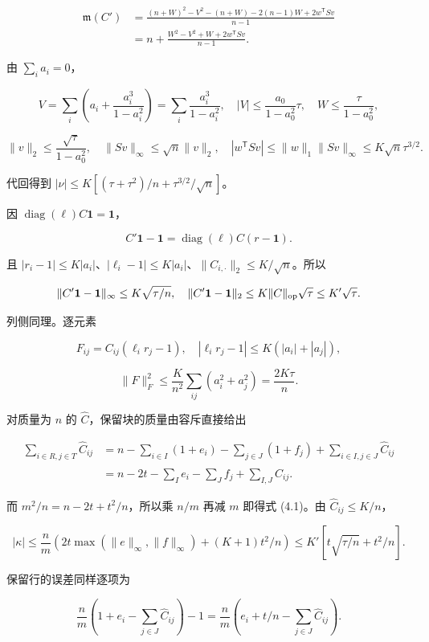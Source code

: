 \documentclass[11pt,a4paper]{article}
\begin{document}
\[
\begin{aligned}
\mathfrak m(C')&=\frac{(n+W)^2-V^2-(n+W)-2(n-1)W+2w^{\mathsf T}Sv}{n-1}\\
&=n+\frac{W^2-V^2+W+2w^{\mathsf T}Sv}{n-1}.
\end{aligned}
\]

由 \(\sum_i a_i=0\)，

\[
V=\sum_i\left(a_i+\frac{a_i^3}{1-a_i^2}\right)
=\sum_i\frac{a_i^3}{1-a_i^2},\quad
|V|\le\frac{a_0}{1-a_0^2}\tau,
\quad W\le\frac\tau{1-a_0^2},
\]

\[
\|v\|_2\le\frac{\sqrt\tau}{1-a_0^2},\quad
\|Sv\|_\infty\le\sqrt n\|v\|_2,\quad
|w^{\mathsf T}Sv|\le\|w\|_1\|Sv\|_\infty\le K\sqrt n\tau^{3/2}.
\]

代回得到 \(|\nu|\le K[(\tau+\tau^2)/n+\tau^{3/2}/\sqrt n]\)。

因 \(\operatorname{diag}(\ell)C\mathbf1=\mathbf1\)，

\[
C'\mathbf1-\mathbf1=\operatorname{diag}(\ell)C(r-\mathbf1).
\]

且 \(|r_i-1|\le K|a_i|\)、\(|\ell_i-1|\le K|a_i|\)、\(\|C_{i,\cdot}\|_2\le K/\sqrt n\)。所以

\[
\|C'\mathbf1-\mathbf1\|_\infty\le K\sqrt{\tau/n},\quad
\|C'\mathbf1-\mathbf1\|_2\le K\|C\|_{\rm op}\sqrt\tau\le K'\sqrt\tau.
\]

列侧同理。逐元素

\[
F_{ij}=C_{ij}(\ell_ir_j-1),\quad
|\ell_ir_j-1|\le K(|a_i|+|a_j|),
\]

\[
\|F\|_F^2\le\frac K{n^2}\sum_{ij}(a_i^2+a_j^2)
=\frac{2K\tau}n.
\]

对质量为 \(n\) 的 \(\widehat C\)，保留块的质量由容斥直接给出

\[
\begin{aligned}
\sum_{i\in R,j\in T}\widehat C_{ij}
&=n-\sum_{i\in I}(1+e_i)-\sum_{j\in J}(1+f_j)
+\sum_{i\in I,j\in J}\widehat C_{ij}\\
&=n-2t-\sum_Ie_i-\sum_Jf_j+\sum_{I,J}\widehat C_{ij}.
\end{aligned}
\]

而 \(m^2/n=n-2t+t^2/n\)，所以乘 \(n/m\) 再减 \(m\) 即得式 (4.1)。由 \(\widehat C_{ij}\le K/n\)，

\[
|\kappa|\le\frac nm\left(2t\max(\|e\|_\infty,\|f\|_\infty)
+(K+1)t^2/n\right)
\le K'[t\sqrt{\tau/n}+t^2/n].
\]

保留行的误差同样逐项为

\[
\frac nm\left(1+e_i-\sum_{j\in J}\widehat C_{ij}\right)-1
=\frac nm\left(e_i+t/n-\sum_{j\in J}\widehat C_{ij}\right).
\]
\end{document}

